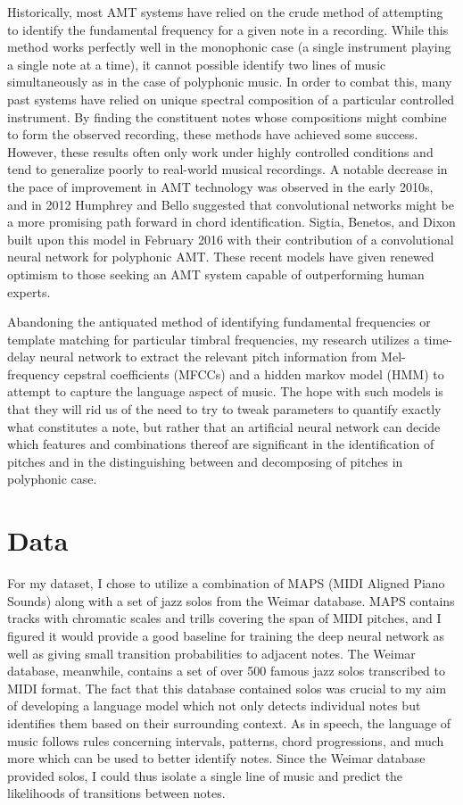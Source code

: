 \documentclass[conference]{IEEEtran}
\begin{document}
Historically, most AMT systems have relied on the crude method of attempting to identify the fundamental frequency for a given note in a recording. While this method works perfectly well in the monophonic case (a single instrument playing a single note at a time), it cannot possible identify two lines of music simultaneously as in the case of polyphonic music. In order to combat this, many past systems have relied on unique spectral composition of a particular controlled instrument. By finding the constituent notes whose compositions might combine to form the observed recording, these methods have achieved some success. However, these results often only work under highly controlled conditions and tend to generalize poorly to real-world musical recordings. A notable decrease in the pace of improvement in AMT technology was observed in the early 2010s, and in 2012 Humphrey and Bello suggested that convolutional networks might be a more promising path forward in chord identification. Sigtia, Benetos, and Dixon built upon this model in February 2016 with their contribution of a convolutional neural network for polyphonic AMT. These recent models have given renewed optimism to those seeking an AMT system capable of outperforming human experts.

Abandoning the antiquated method of identifying fundamental frequencies or template matching for particular timbral frequencies, my research utilizes a time-delay neural network to extract the relevant pitch information from Mel-frequency cepstral coefficients (MFCCs) and a hidden markov model (HMM) to attempt to capture the language aspect of music. The hope with such models is that they will rid us of the need to try to tweak parameters to quantify exactly what constitutes a note, but rather that an artificial neural network can decide which features and combinations thereof are significant in the identification of pitches and in the distinguishing between and decomposing of pitches in polyphonic case.

\section{Data}

For my dataset, I chose to utilize a combination of MAPS (MIDI Aligned Piano Sounds) along with a set of jazz solos from the Weimar database. MAPS contains tracks with chromatic scales and trills covering the span of MIDI pitches, and I figured it would provide a good baseline for training the deep neural network as well as giving small transition probabilities to adjacent notes. The Weimar database, meanwhile, contains a set of over 500 famous jazz solos transcribed to MIDI format. The fact that this database contained solos was crucial to my aim of developing a language model which not only detects individual notes but identifies them based on their surrounding context. As in speech, the language of music follows rules concerning intervals, patterns, chord progressions, and much more which can be used to better identify notes. Since the Weimar database provided solos, I could thus isolate a single line of music and predict the likelihoods of transitions between notes. 
\end{document}
